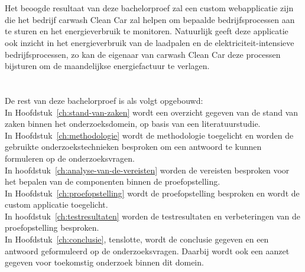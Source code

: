 \section{}%
\label{sec:onderzoeksdoelstelling}

Het beoogde resultaat van deze bachelorproef zal een custom webapplicatie zijn die het bedrijf carwash Clean Car zal helpen om bepaalde bedrijfsprocessen aan te sturen en het energieverbruik te monitoren. Natuurlijk geeft deze applicatie ook inzicht in het energieverbruik van de laadpalen en de elektriciteit-intensieve bedrijfsprocessen, zo kan de eigenaar van carwash Clean Car deze processen bijsturen om de maandelijkse energiefactuur te verlagen.

\section{}%
\label{sec:opzet-bachelorproef}


De rest van deze bachelorproef is als volgt opgebouwd:\\

In Hoofdstuk~\ref{ch:stand-van-zaken} wordt een overzicht gegeven van de stand van zaken binnen het onderzoeksdomein, op basis van een literatuurstudie.\\

In Hoofdstuk~\ref{ch:methodologie} wordt de methodologie toegelicht en worden de gebruikte onderzoekstechnieken besproken om een antwoord te kunnen formuleren op de onderzoeksvragen.\\

In hoofdstuk~\ref{ch:analyse-van-de-vereisten} worden de vereisten besproken voor het bepalen van de componenten binnen de proefopstelling.\\

In Hoofdstuk~\ref{ch:proefopstelling} wordt de proefopstelling besproken en wordt de custom applicatie toegelicht.\\

In hoofdstuk~\ref{ch:testresultaten} worden de testresultaten en verbeteringen van de proefopstelling besproken.\\

In Hoofdstuk~\ref{ch:conclusie}, tenslotte, wordt de conclusie gegeven en een antwoord geformuleerd op de onderzoeksvragen. Daarbij wordt ook een aanzet gegeven voor toekomstig onderzoek binnen dit domein.